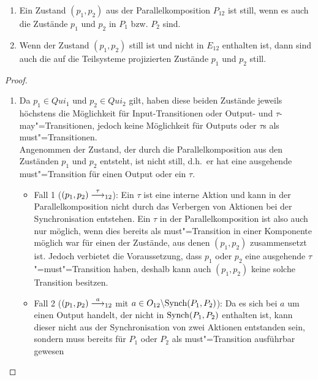 \begin{Lem}\mbox{}
  \label{StilleZustLem}
  \begin{enumerate}
    \item Ein Zustand $(p_1,p_2)$ aus der Parallelkomposition $P_{12}$ ist
      still, wenn es auch die Zustände $p_1$ und $p_2$ in $P_1$ bzw. $P_2$
      sind.
    \item Wenn der Zustand $(p_1,p_2)$ still ist und nicht in $E_{12}$
      enthalten ist, dann sind auch die auf die Teilsysteme projizierten
      Zustände $p_1$ und $p_2$ still.
  \end{enumerate}
\end{Lem}
\begin{proof}\mbox{}
  \begin{enumerate}
    \item Da $p_1\in Qui_1$ und $p_2\in Qui_2$ gilt, haben diese beiden
      Zustände jeweils höchstens die Möglichkeit für Input-Transitionen oder
      Output- und $\tau$-may"=Transitionen, jedoch keine Möglichkeit für Outputs
      oder $\tau$s als must"=Transitionen.\\
      Angenommen der Zustand, der durch die Parallelkomposition aus den
      Zuständen $p_1$ und $p_2$ entsteht, ist nicht still, d.h.\ er hat eine
      ausgehende must"=Transition für einen Output oder ein $\tau$.
      \begin{itemize}
        \item Fall 1 \big($(p_1,p_2)\must[\tau]_{12}$\big): Ein $\tau$ ist eine
          interne Aktion und kann in der Parallelkomposition nicht durch das
          Verbergen von Aktionen bei der Synchronisation entstehen. Ein $\tau$
          in der Parallelkomposition ist also auch nur möglich, wenn dies
          bereits als must"=Transition in einer Komponente möglich war für
          einen der Zustände, aus denen $(p_1,p_2)$ zusammensetzt ist. Jedoch
          verbietet die Voraussetzung, dass $p_1$ oder $p_2$ eine ausgehende
          $\tau$"=must"=Transition haben, deshalb kann auch $(p_1,p_2)$ keine
          solche Transition besitzen.
        \item Fall 2 \big($(p_1,p_2)\must[a]_{12}$ mit $a\in O_{12}\backslash
          \mathrm{Synch}(P_1,P_2)$\big): Da es sich bei $a$ um einen Output handelt, der
          nicht in $\mathrm{Synch} (P_1,P_2)$ enthalten ist, kann dieser nicht aus der
          Synchronisation von zwei Aktionen entstanden sein, sondern muss
          bereits für $P_1$ oder $P_2$ als must"=Transition ausführbar gewesen

\end{itemize}
\end{enumerate}
\end{proof}
